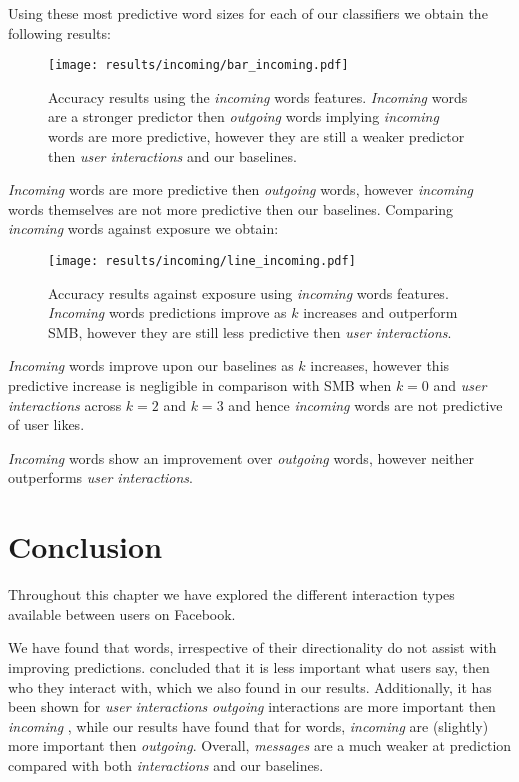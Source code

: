 Using these most predictive word sizes for each of our classifiers we obtain the following results:

\begin{figure}[h]
	\begin{center}
		\texttt{[image: results/incoming/bar\_incoming.pdf]}
		\caption{Accuracy results using the \emph{incoming} words features. \emph{Incoming} words are a 
				 stronger predictor then \emph{outgoing} words implying \emph{incoming} words are more predictive, however they are still a weaker predictor then \emph{user interactions} and our baselines.}
	\end{center}
\end{figure}

\emph{Incoming} words are more predictive then \emph{outgoing} words, however \emph{incoming} words themselves are not more predictive then our baselines.
Comparing \emph{incoming} words against exposure we obtain:

\begin{figure}[h]
	\begin{center}
		\texttt{[image: results/incoming/line\_incoming.pdf]}
		\caption{Accuracy results against exposure using \emph{incoming} words features. 
				 \emph{Incoming} words predictions improve as $k$ increases and outperform SMB, however they are still less predictive then \emph{user interactions}.
		}
	\end{center}
\end{figure}

\clearpage

\emph{Incoming} words improve upon our baselines as $k$ increases, however this predictive increase is 
negligible in comparison with SMB when $k = 0$ and \emph{user interactions} across $k=2$ and $k=3$ and 
hence \emph{incoming} words are not predictive of user likes.

\emph{Incoming} words show an improvement over \emph{outgoing} words, however neither outperforms \emph{user interactions}.

\section{Conclusion}
\label{sec:conc}

Throughout this chapter we have explored the different interaction types available between users on Facebook. 

We have found that words, irrespective of their directionality do not assist with improving predictions. \cite{Anderson2012} concluded 
that it is less important what users say, then who they interact with, which we also found in our results. Additionally, it has been shown
for \emph{user interactions} \emph{outgoing} interactions are more important then \emph{incoming} \cite{www}, while our results have found that
for words, \emph{incoming} are (slightly) more important then \emph{outgoing}. Overall, \emph{messages} are a much weaker at prediction compared 
with both \emph{interactions} and our baselines.

